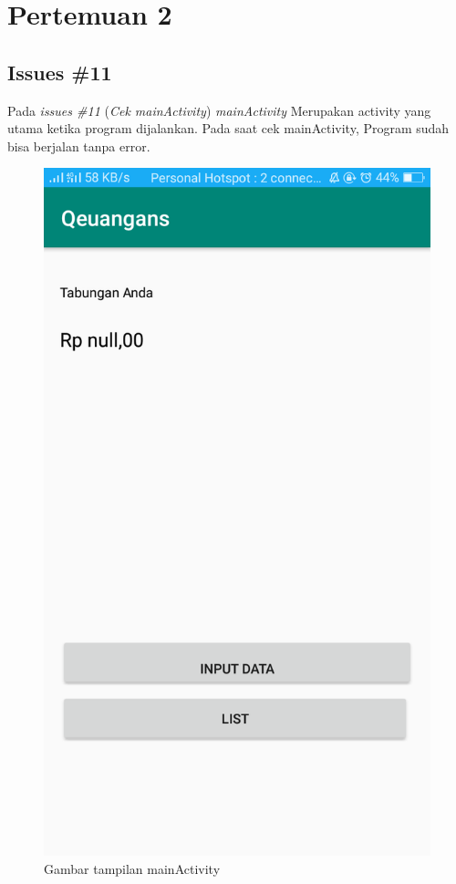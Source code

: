 \chapter{Pertemuan 2}

\section{Issues \#11}
Pada \textit{issues \#11} (\textit{Cek mainActivity}) \textit{mainActivity} Merupakan activity yang utama ketika program dijalankan. Pada saat cek mainActivity, Program sudah bisa berjalan tanpa error. 
\begin{figure}[]
        \centering
        \includegraphics[scale = 0.3]{pictures/mainActivity.png}
        \caption{Gambar tampilan mainActivity}
        \label{mainActivity}
\end{figure}

